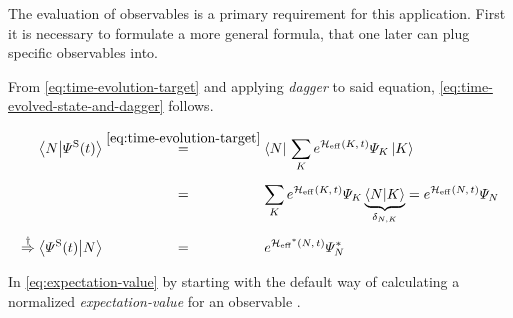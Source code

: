 The evaluation of observables is a primary requirement for this application. 
First it is necessary to formulate a more general formula, that one later can plug specific observables into.

From \autoref{eq:time-evolution-target} and applying \emph{dagger} to said equation, \autoref{eq:time-evolved-state-and-dagger} follows.


\begin{equation}
    \label{eq:time-evolved-state-and-dagger}
    \begin{split}
        \braketHelper{N}{\psiOfT[\schroedingerPicture]} &\stackrel{\ref{eq:time-evolution-target}}{=} \braN{} \lsum[K] e^{\HeffOft[K]} \psiN[K] \ketN[K]{}\\
        & \stackrel{\phantom{\ref{eq:time-evolution-target}}}{=} 
        \lsum[K]   e^{\HeffOft[K]} \psiN[K] \underbrace{\braketHelper{N}{K}}_\text{$\delta_{N,K}$} = e^{\HeffOft} \psiN{} \\
        \stackrel{\dagger}{\Rightarrow} \braketHelper{\psiOfT[\schroedingerPicture]}{N} &\stackrel{\phantom{\ref{eq:time-evolution-target}}}{=} e^{\HeffOftStar} \psiNStar
    \end{split}
\end{equation}

In \autoref{eq:expectation-value} by starting with the default way of calculating a normalized \emph{expectation-value} for an observable \ObservableOp.

